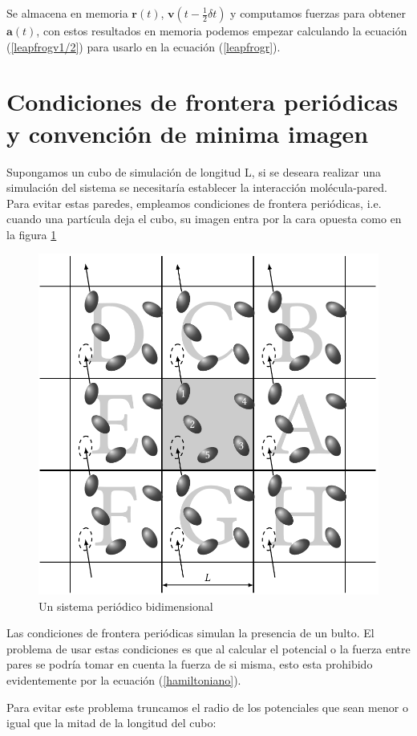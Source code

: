 Se almacena en memoria $\mathbf{r}(t)$, $\mathbf{v}(t - \frac{1}{2}\delta t)$ y computamos fuerzas para obtener $\mathbf{a}(t)$, con estos resultados en memoria podemos empezar calculando la ecuación (\ref{leapfrogv1/2}) para usarlo en la ecuación (\ref{leapfrogr}).

\section{Condiciones de frontera periódicas y convención de minima imagen}

Supongamos un cubo de simulación de longitud L, si se deseara realizar una simulación del sistema se necesitaría establecer la interacción molécula-pared. Para evitar estas paredes, empleamos condiciones de frontera periódicas, i.e. cuando una partícula deja el cubo, su imagen entra por la cara opuesta como en la figura \ref{fig:PBC}

\begin{figure}[!h]
    \centering
    \includegraphics[width=.7\textwidth,keepaspectratio=true]{PBC.png}
    \caption{Un sistema periódico bidimensional \cite{Allen2017}}
    \label{fig:PBC}
\end{figure}

Las condiciones de frontera periódicas simulan la presencia de un bulto. El problema de usar estas condiciones es que al calcular el potencial o la fuerza entre pares se podría tomar en cuenta la fuerza de si misma, esto esta prohibido evidentemente por la ecuación (\ref{hamiltoniano}).

Para evitar este problema truncamos el radio de los potenciales que sean menor o igual que la mitad de la longitud del cubo:

